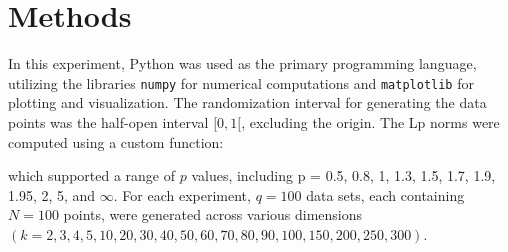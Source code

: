 \section{Methods}
In this experiment, Python was used as the primary programming language, utilizing the
libraries \texttt{numpy} for numerical computations and \texttt{matplotlib} for plotting
and visualization. The randomization interval for generating the data points was the
half-open interval \([0,1[\), excluding the origin. The Lp norms were computed using
a custom function:



which supported a range of \(p\) values, including p = 0.5, 0.8, 1, 1.3, 1.5, 1.7, 1.9,
1.95, 2, 5, and \(\infty\). For each experiment, \(q = 100\) data sets, each containing
\(N = 100\) points, were generated across various dimensions \((k = 2, 3, 4, 5, 10, 20,
30, 40, 50, 60, 70, 80, 90, 100, 150, 200, 250, 300)\).
